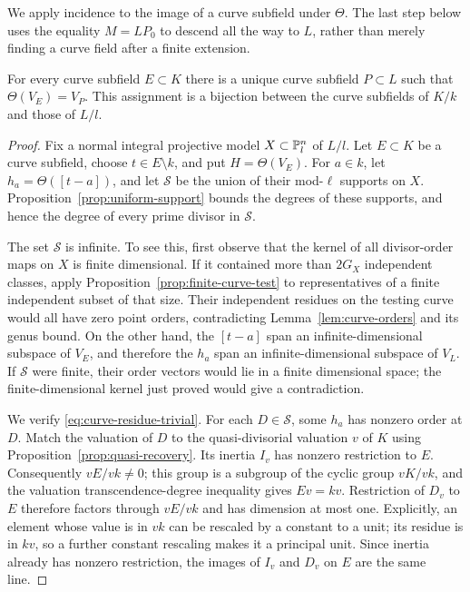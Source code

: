 We apply incidence to the image of a curve subfield under $\Theta$.
The last step below uses the equality $M=LP_0$ to descend all the way to
$L$, rather than merely finding a curve field after a finite extension.

\begin{theorem}
\label{thm:curve-matching}
For every curve subfield $E\subset K$ there is a unique curve subfield
$P\subset L$ such that $\Theta(V_E)=V_P$.  This assignment is a bijection
between the curve subfields of $K/k$ and those of $L/l$.
\end{theorem}

\begin{proof}
Fix a normal integral projective model $X\subset\mathbb P_l^n$ of $L/l$.
Let $E\subset K$ be a curve subfield, choose $t\in E\setminus k$, and
put $H=\Theta(V_E)$.  For $a\in k$, let $h_a=\Theta([t-a])$, and let
$\mathcal S$ be the union of their mod-$\ell$ supports on $X$.
Proposition~\ref{prop:uniform-support} bounds the degrees of these
supports, and hence the degree of every prime divisor in $\mathcal S$.

The set $\mathcal S$ is infinite.  To see this, first observe that the
kernel of all divisor-order maps on $X$ is finite dimensional.  If it
contained more than $2G_X$ independent classes, apply
Proposition~\ref{prop:finite-curve-test} to representatives of a finite
independent subset of that size.  Their independent residues on the
testing curve would all have zero point orders, contradicting
Lemma~\ref{lem:curve-orders} and its genus bound.  On the other hand,
the $[t-a]$ span an infinite-dimensional subspace of $V_E$, and therefore
the $h_a$ span an infinite-dimensional subspace of $V_L$.  If
$\mathcal S$ were finite, their order vectors would lie in a finite
dimensional space; the finite-dimensional kernel just proved would give
a contradiction.

We verify \eqref{eq:curve-residue-trivial}.  For each $D\in\mathcal S$,
some $h_a$ has nonzero order at $D$.  Match the valuation of $D$ to the
quasi-divisorial valuation $v$ of $K$ using
Proposition~\ref{prop:quasi-recovery}.  Its inertia $I_v$ has nonzero
restriction to $E$.  Consequently $vE/vk\ne0$; this group is a subgroup
of the cyclic group $vK/vk$, and the valuation transcendence-degree
inequality gives $Ev=kv$.  Restriction of $D_v$ to $E$ therefore factors
through $vE/vk$ and has dimension at most one.  Explicitly, an element
whose value is in $vk$ can be rescaled by a constant to a unit; its
residue is in $kv$, so a further constant rescaling makes it a principal
unit.  Since inertia already has nonzero restriction, the images of
$I_v$ and $D_v$ on $E$ are the same line.


\end{proof}
